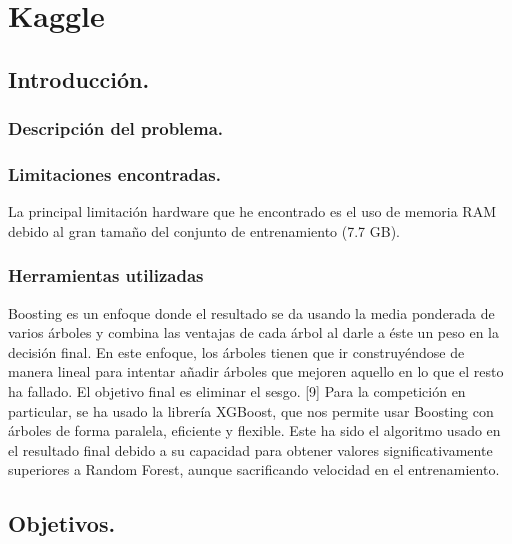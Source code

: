 \chapter[Kaggle]{Kaggle}
\section{Introducción.}
\subsection{Descripción del problema.}
\subsection{Limitaciones encontradas.}
La principal limitación hardware que he encontrado es el uso de memoria RAM debido al gran tamaño del conjunto de entrenamiento (7.7 GB).
\subsection{Herramientas utilizadas}
Boosting es un enfoque donde el resultado se da usando la media
ponderada de varios árboles y combina las ventajas de cada árbol al darle
a éste un peso en la decisión final. En este enfoque, los árboles tienen
que ir construyéndose de manera lineal para intentar añadir árboles que
mejoren aquello en lo que el resto ha fallado. El objetivo final es eliminar el
sesgo. [9]
Para la competición en particular, se ha usado la librería XGBoost,
que nos permite usar Boosting con árboles de forma paralela, eficiente y
flexible. Este ha sido el algoritmo usado en el resultado final debido a su
capacidad para obtener valores significativamente superiores a Random
Forest, aunque sacrificando velocidad en el entrenamiento.
\section{Objetivos.}

